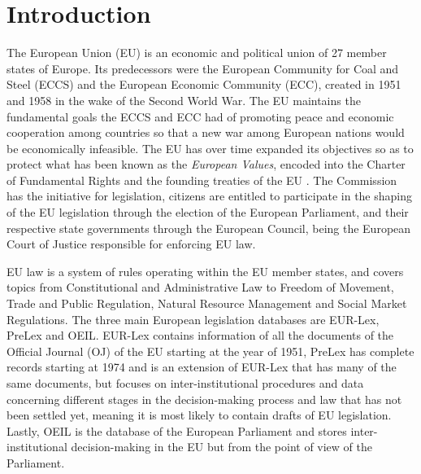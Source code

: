 \documentclass[sigconf, authorversion]{acmart}
\begin{document}



\maketitle

\section{Introduction}
\label{intro}
The European Union (EU) is an economic and political union of 27 member states of Europe. Its predecessors were the European Community for Coal and Steel (ECCS) and the European Economic Community (ECC), created in 1951 and 1958 in the wake of the Second World War. The EU maintains the fundamental goals the ECCS and ECC had of promoting peace and economic cooperation among countries so that a new war among European nations would be economically infeasible. The EU has over time expanded its objectives so as to protect what has been known as the \textit{European Values}, encoded into the Charter of Fundamental Rights \cite{cfr} and the founding treaties of the EU \cite{teu, tfeu}.
The Commission has the initiative for legislation, citizens are entitled to participate in the shaping of the EU legislation through the election of the European Parliament, and their respective state governments through the European Council, being the European Court of Justice responsible for enforcing EU law.

EU law is a system of rules operating within the EU member states, and covers topics from Constitutional and Administrative Law to Freedom of Movement, Trade and Public Regulation, Natural Resource Management and Social Market Regulations.
The three main European legislation databases are EUR-Lex, PreLex and OEIL. EUR-Lex contains information of all the documents of the Official Journal (OJ) of the EU starting at the year of 1951, PreLex has complete records starting at 1974 and is an extension of EUR-Lex that has many of the same documents, but focuses on inter-institutional procedures and data concerning different stages in the decision-making process and law that has not been settled yet, meaning it is most likely to contain drafts of EU legislation. Lastly, OEIL is the database of the European Parliament and stores inter-institutional decision-making in the EU but from the point of view of the Parliament.
\end{document}
